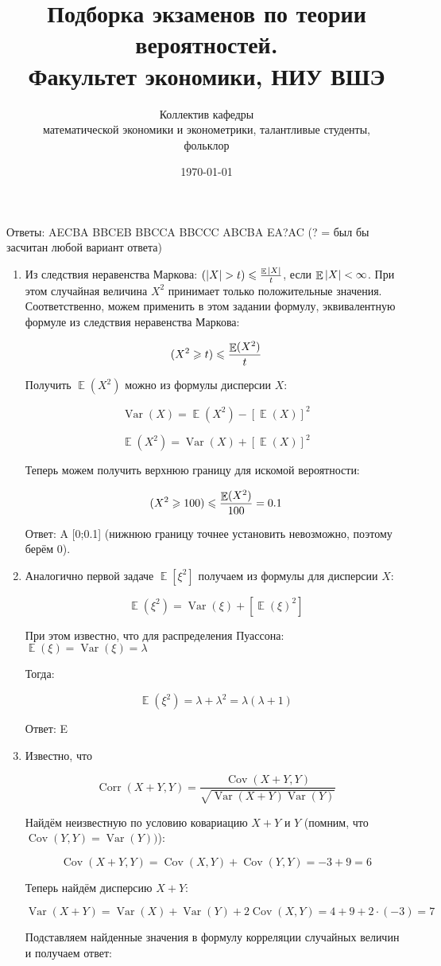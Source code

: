 \documentclass[11pt, a4paper]{article}
\title{Подборка экзаменов по теории вероятностей. \\Факультет экономики, НИУ ВШЭ}
\date{\today}
\author{Коллектив кафедры \\
математической экономики и эконометрики,
талантливые студенты,\\
 фольклор}
\DeclareMathOperator{\Var}{Var}
\DeclareMathOperator{\Cov}{Cov}
\DeclareMathOperator{\Corr}{Corr}
\DeclareMathOperator{\E}{\mathbb{E}}
\let\P\relax
\DeclareMathOperator{\P}{\mathbb{P}}
\renewcommand{\leq}{\leqslant}
\renewcommand{\geq}{\geqslant}
\theoremstyle{definition}
\begin{document}
Ответы: AECBA BBCEB BBCCA BBCCC ABCBA EA?AC (? = был бы засчитан любой вариант ответа)

\begin{enumerate}
	
	\item  
	Из следствия неравенства Маркова: $\P(\abs{X}>t)\leq\frac{\E \abs{X}}{t}$, если $\E \abs{X}<\infty$. 
	При этом случайная величина $X^2$ принимает только положительные значения.
	Соответственно, можем применить в этом задании формулу, эквивалентную формуле из следствия неравенства Маркова:
	
	\[
	\P(X^2\geq t)\leq \frac{\E(X^2)}{t}
	\]
	
	Получить $\E(X^2)$ можно из формулы дисперсии $X$:
	
	\[
	\Var(X)=\E(X^2)-[\E(X)]^2
	\]
	
	\[
	\E(X^2)=\Var(X)+[\E(X)]^2
	\]
	
	Теперь можем получить верхнюю границу для искомой вероятности:
	
	\[
	\P(X^2\geq 100)\leq \frac{\E(X^2)}{100} = 0.1
	\]
	
	Ответ: A [0;0.1] (нижнюю границу точнее установить невозможно, поэтому берём 0).
	
	\item
	
	Аналогично первой задаче $\E[\xi^2]$ получаем из формулы для дисперсии $X$:
	
	\[
	\E(\xi^2)=\Var(\xi)+[\E(\xi)^2]
	\]
	
	При этом известно, что для распределения Пуассона: $\E(\xi)=\Var(\xi)=\lambda$
	
	Тогда:
	
	\[
	\E(\xi^2)=\lambda+\lambda^2=\lambda(\lambda+1)
	\]
	
	Ответ: E
	
	
	\item 
	
	Известно, что
	
	\[
	\Corr(X+Y,Y)=\frac{\Cov(X+Y,Y)}{\sqrt{\Var(X+Y)\Var(Y)}}
	\]
	
	Найдём неизвестную по условию ковариацию $X+Y$ и $Y$ (помним, что $\Cov(Y,Y)=\Var(Y))$):
	
	\[
	\Cov(X+Y,Y)=\Cov(X,Y)+\Cov(Y,Y)=-3+9=6
	\]
	
	Теперь найдём дисперсию $X+Y$:
	
	\[
	\Var(X+Y)=\Var(X)+\Var(Y)+2 \Cov(X,Y)=4+9+2\cdot(-3)=7
	\]
	
	Подставляем найденные значения в формулу корреляции случайных величин и получаем ответ:
	

\end{enumerate}
\end{document}
